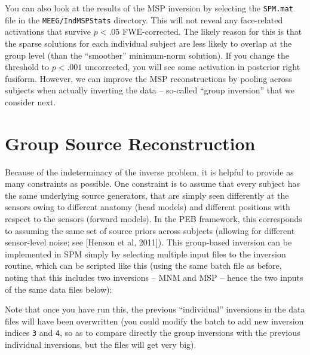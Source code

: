 You can also look at the results of the MSP inversion by selecting the \texttt{SPM.mat} file in the \texttt{MEEG/IndMSPStats} directory. This will not reveal any face-related activations that survive \(p<.05\) FWE-corrected. The likely reason for this is that the sparse solutions for each individual subject are less likely to overlap at the group level (than the ``smoother'' minimum-norm solution). If you change the threshold to \(p<.001\) uncorrected, you will see some activation in posterior right fusiform. However, we can improve the MSP reconstructions by pooling across subjects when actually inverting the data -- so-called ``group inversion'' that we consider next.

\section{Group Source Reconstruction}

Because of the indeterminacy of the inverse problem, it is helpful to provide as many constraints as possible. One constraint is to assume that every subject has the same underlying source generators, that are simply seen differently at the sensors owing to different anatomy (head models) and different positions with respect to the sensors (forward models). In the PEB framework, this corresponds to assuming the same set of source priors across subjects (allowing for different sensor-level noise; see [Henson et al, 2011]). This group-based inversion can be implemented in SPM simply by selecting multiple input files to the inversion routine, which can be scripted like this (using the same batch file as before, noting that this includes two inversions -- MNM and MSP -- hence the two inputs of the same data files below):


Note that once you have run this, the previous ``individual'' inversions in the data files will have been overwritten (you could modify the batch to add new inversion indices \texttt{3} and \texttt{4}, so as to compare directly the group inversions with the previous individual inversions, but the files will get very big).

